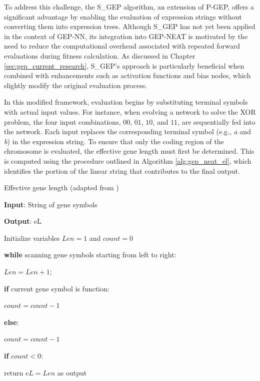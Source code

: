 \parbreak\noindent To address this challenge, the S\_GEP algorithm, an extension of P-GEP, offers a significant advantage by enabling the evaluation of expression strings without converting them into expression trees. Although S\_GEP has not yet been applied in the context of GEP-NN, its integration into GEP-NEAT is motivated by the need to reduce the computational overhead associated with repeated forward evaluations during fitness calculation. As discussed in Chapter \ref{sec:gep_current_research}, S\_GEP's approach is particularly beneficial when combined with enhancements such as activation functions and bias nodes, which slightly modify the original evaluation process.

\parbreak\noindent In this modified framework, evaluation begins by substituting terminal symbols with actual input values. For instance, when evolving a network to solve the XOR problem, the four input combinations, $00$, $01$, $10$, and $11$, are sequentially fed into the network. Each input replaces the corresponding terminal symbol (e.g., \textit{a} and \textit{b}) in the expression string. To ensure that only the coding region of the chromosome is evaluated, the effective gene length must first be determined. This is computed using the procedure outlined in Algorithm \ref{alg:gep_neat_el}, which identifies the portion of the linear string that contributes to the final output.

\parbreak
\begin{algorithm}
	\caption{Effective gene length (adapted from \cite{peng2014improved})}\label{alg:gep_neat_el}
	\begin{algorithmic}[1]
	\item \textbf{Input}: String of gene symbols
	\item \textbf{Output}: eL
	\item Initialize variables $Len=1$ and $count=0$
	\item \textbf{while} scanning gene symbols starting from left to right:
	\item \quad $Len = Len + 1$;
	\item \quad \textbf{if} current gene symbol is function:
	\item \quad \quad $count = count - 1$
	\item \quad \textbf{else}:
	\item \quad \quad $count = count - 1$
	\item \quad \textbf{if} $count < 0$:
	\item \quad \quad return $eL=Len$ as output
\end{algorithmic}
\end{algorithm}

